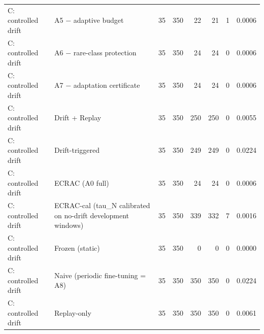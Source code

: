 \begin{table}[t]
\begin{tabular}{llrrrrrr}
C: controlled drift & A5 − adaptive budget & 35 & 350 & 22 & 21 & 1 & 0.0006 \\
C: controlled drift & A6 − rare-class protection & 35 & 350 & 24 & 24 & 0 & 0.0006 \\
C: controlled drift & A7 − adaptation certificate & 35 & 350 & 24 & 24 & 0 & 0.0006 \\
C: controlled drift & Drift + Replay & 35 & 350 & 250 & 250 & 0 & 0.0055 \\
C: controlled drift & Drift-triggered & 35 & 350 & 249 & 249 & 0 & 0.0224 \\
C: controlled drift & ECRAC (A0 full) & 35 & 350 & 24 & 24 & 0 & 0.0006 \\
C: controlled drift & ECRAC-cal (tau\_N calibrated on no-drift development windows) & 35 & 350 & 339 & 332 & 7 & 0.0016 \\
C: controlled drift & Frozen (static) & 35 & 350 & 0 & 0 & 0 & 0.0000 \\
C: controlled drift & Naive (periodic fine-tuning = A8) & 35 & 350 & 350 & 350 & 0 & 0.0224 \\
C: controlled drift & Replay-only & 35 & 350 & 350 & 350 & 0 & 0.0061 \\
\bottomrule
\end{tabular}
\end{table}